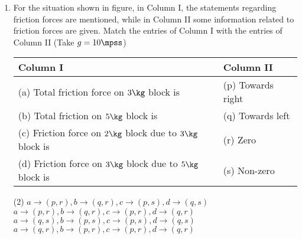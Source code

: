 \documentclass{article}
\renewcommand{\ans}{\quad}
\begin{document}
\begin{enumerate}
    \item For the situation shown in figure, in Column I, the statements regarding friction forces are mentioned, while in Column II some information related to friction forces are given. Match the entries of Column I with the entries of Column II (Take $g = 10 \mpss$)
    \begin{center}
    \end{center}
    \begin{center}
        \renewcommand{\arraystretch}{1.5}
        \begin{table}[h]
            \centering
            \begin{tabular}{p{8cm}|p{3cm}}
            \hline
            Column I & Column II \\
            \hline
            (a) Total friction force on $3\kg$ block is & (p) Towards right\\
            (b) Total friction on $5\kg$ block is & (q) Towards left\\
            (c) Friction force on $2\kg$ block due to $3\kg$ block is & (r) Zero\\
            (d) Friction force on $3\kg$ block due to $5\kg$ block is & (s) Non-zero\\
            \hline
            \end{tabular}
        \end{table}
    \end{center}
    \begin{tasks}(2)
        \task $a \rightarrow (p, r), b \rightarrow (q, r), c \rightarrow (p, s), d \rightarrow (q, s)$
        \task $a \rightarrow (p, r), b \rightarrow (q, r), c \rightarrow (p, r), d \rightarrow (q, r)$
        \task $a \rightarrow (q, s), b \rightarrow (p, s), c \rightarrow (p, s), d \rightarrow (q, s)$\ans
        \task $a \rightarrow (q, r), b \rightarrow (p, r), c \rightarrow (p, r), d \rightarrow (q, r)$
    \end{tasks}
    

\end{enumerate}
\end{document}
